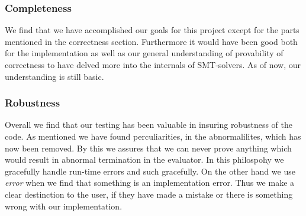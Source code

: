 \subsubsection{Completeness}
We find that we have accomplished our goals for this project except for the parts mentioned in the correctness section.
Furthermore it would have been good both for the implementation as well as our general understanding of provability of correctness to have delved more into the internals of SMT-solvers.
As of now, our understanding is still basic.

\subsubsection{Robustness}
Overall we find that our testing has been valuable in insuring robustness of the code. As mentioned we have found perculiarities, in the abnormalilites, which has now been removed. By this we assures that we can never prove anything which would result in abnormal termination in the evaluator. In this philospohy we gracefully handle run-time errors and such gracefully. On the other hand we use \textit{error} when we find that something is an implementation error. Thus we make a clear destinction to the user, if they have made a mistake or there is something wrong with our implementation.

